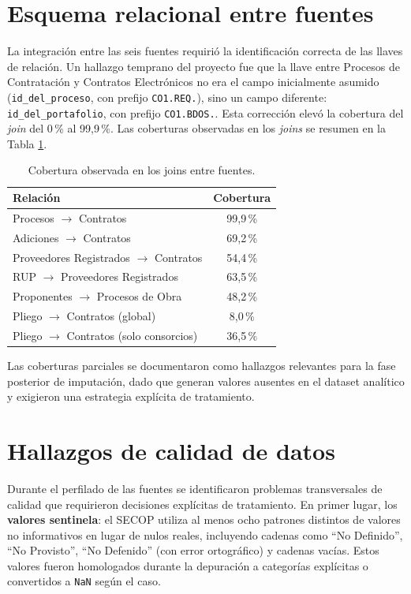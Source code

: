 \documentclass[12pt,letterpaper,oneside]{report}
\begin{document}
\section{Esquema relacional entre fuentes}

La integración entre las seis fuentes requirió la identificación correcta de
las llaves de relación. Un hallazgo temprano del proyecto fue que la llave
entre Procesos de Contratación y Contratos Electrónicos no era el campo
inicialmente asumido (\texttt{id\_del\_proceso}, con prefijo
\texttt{CO1.REQ.}), sino un campo diferente: \texttt{id\_del\_portafolio}, con
prefijo \texttt{CO1.BDOS.}. Esta corrección elevó la cobertura del \emph{join}
del 0\,\% al 99,9\,\%. Las coberturas observadas en los \emph{joins} se
resumen en la Tabla \ref{tab:cobertura}.

\begin{table}[h!]
\centering
\caption{Cobertura observada en los joins entre fuentes.}
\label{tab:cobertura}
\begin{tabular}{lc}
\toprule
\textbf{Relación} & \textbf{Cobertura} \\
\midrule
Procesos $\rightarrow$ Contratos & 99,9\,\% \\
Adiciones $\rightarrow$ Contratos & 69,2\,\% \\
Proveedores Registrados $\rightarrow$ Contratos & 54,4\,\% \\
RUP $\rightarrow$ Proveedores Registrados & 63,5\,\% \\
Proponentes $\rightarrow$ Procesos de Obra & 48,2\,\% \\
Pliego $\rightarrow$ Contratos (global) & 8,0\,\% \\
Pliego $\rightarrow$ Contratos (solo consorcios) & 36,5\,\% \\
\bottomrule
\end{tabular}
\end{table}

Las coberturas parciales se documentaron como hallazgos relevantes para la
fase posterior de imputación, dado que generan valores ausentes en el dataset
analítico y exigieron una estrategia explícita de tratamiento.

\section{Hallazgos de calidad de datos}

Durante el perfilado de las fuentes se identificaron problemas transversales
de calidad que requirieron decisiones explícitas de tratamiento. En primer
lugar, los \textbf{valores sentinela}: el SECOP utiliza al menos ocho patrones
distintos de valores no informativos en lugar de nulos reales, incluyendo
cadenas como ``No Definido'', ``No Provisto'', ``No Defenido'' (con error
ortográfico) y cadenas vacías. Estos valores fueron homologados durante la
depuración a categorías explícitas o convertidos a \texttt{NaN} según el caso.
\end{document}
